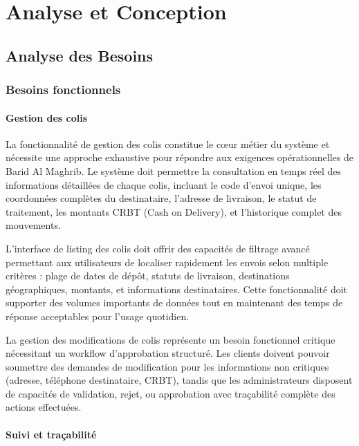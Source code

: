 \chapter{Analyse et Conception}

\section{Analyse des Besoins}

\subsection{Besoins fonctionnels}

\subsubsection{Gestion des colis}

La fonctionnalité de gestion des colis constitue le cœur métier du système et nécessite une approche exhaustive pour répondre aux exigences opérationnelles de Barid Al Maghrib. Le système doit permettre la consultation en temps réel des informations détaillées de chaque colis, incluant le code d'envoi unique, les coordonnées complètes du destinataire, l'adresse de livraison, le statut de traitement, les montants CRBT (Cash on Delivery), et l'historique complet des mouvements.

L'interface de listing des colis doit offrir des capacités de filtrage avancé permettant aux utilisateurs de localiser rapidement les envois selon multiple critères : plage de dates de dépôt, statuts de livraison, destinations géographiques, montants, et informations destinataires. Cette fonctionnalité doit supporter des volumes importants de données tout en maintenant des temps de réponse acceptables pour l'usage quotidien.

La gestion des modifications de colis représente un besoin fonctionnel critique nécessitant un workflow d'approbation structuré. Les clients doivent pouvoir soumettre des demandes de modification pour les informations non critiques (adresse, téléphone destinataire, CRBT), tandis que les administrateurs disposent de capacités de validation, rejet, ou approbation avec traçabilité complète des actions effectuées.

\subsubsection{Suivi et traçabilité}

